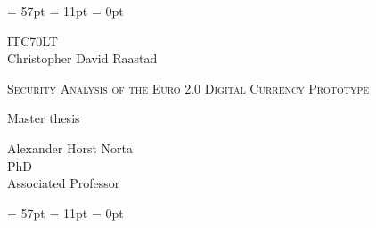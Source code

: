 \documentclass[a4paper,12pt]{article} %
\begin{document}

\thispagestyle{fancy} %
\renewcommand{\headrulewidth}{0pt} %
\renewcommand{\footrulewidth}{0pt} %
\headheight = 57pt %
\footskip = 11pt %
\headsep = 0pt %

\vspace*{7 cm} %

\begin{center} %
ITC70LT\\[0cm]
Christopher David Raastad\\
\begin{LARGE}
\textsc{Security Analysis of the Euro 2.0 Digital Currency Prototype\\}
\end{LARGE}
Master thesis\\[2cm]
\end{center}

\begin{flushright} %
Alexander Horst Norta\\[0cm]
PhD\\[0cm]
Associated Professor\\[0cm]
\end{flushright}

\pagebreak %

\thispagestyle{fancy} %
\renewcommand{\headrulewidth}{0pt} %
\renewcommand{\footrulewidth}{0pt} %
\headheight = 57pt %
\footskip = 11pt %
\headsep = 0pt %
\end{document}
